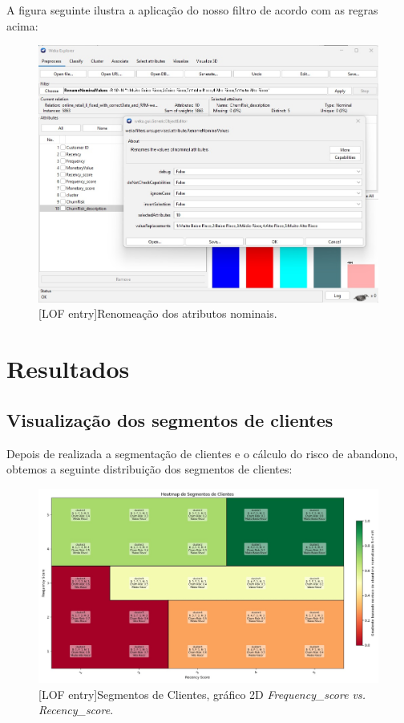 \documentclass{easychair}
\begin{document}
\newpage
A figura seguinte ilustra a aplicação do nosso filtro de acordo com as regras acima:

\begin{figure}[H]
    \begin{centering}
    \includegraphics[width=1\linewidth]{imagens/figure23.jpg}\label{cap-4-fig23}
    [LOF entry]{Renomeação dos atributos nominais.}
    \label{fig23}
    \end{centering}
\end{figure}

\newpage

\section{Resultados}
\subsection{Visualização dos segmentos de clientes}

Depois de realizada a segmentação de clientes e o cálculo do risco de abandono, obtemos a seguinte distribuição dos segmentos de clientes:

\begin{figure}[H]
    \begin{centering}
    \includegraphics[width=0.8\linewidth]{imagens/figure24.jpg}\label{cap-5-fig24}
    [LOF entry]{Segmentos de Clientes, gráfico 2D \textit{Frequency_score vs. Recency_score}.}
    \label{fig24}
    \end{centering}
\end{figure}
\end{document}
